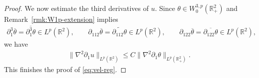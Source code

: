 \documentclass[10pt]{amsart}
\theoremstyle{definition}
\theoremstyle{remark}
\numberwithin{equation}{section}
\newcommand{\rd}{\partial}
\newcommand{\0}{\emptyset}
\newcommand{\tht}{\theta}
\newcommand{\bbR}{\mathbb R}
\begin{document}
\begin{proof}
		
		We now estimate the third derivatives of $u$. Since $\tht \in W^{3,p}_{0}(\bbR^2_{+})$ and Remark~\ref{rmk:W1p-extension} implies \begin{equation*}
			\begin{split}
				\rd_{1}^{3} \overline{\tht} = \overline{\rd_{1}^{3}\tht} \in L^p(\bbR^2), \qquad \rd_{112} \overline{\tht} = \widetilde{\rd_{112}\tht} \in L^p(\bbR^2), \qquad \rd_{122} \overline{\tht} = \overline{\rd_{122}\tht} \in L^p(\bbR^2),
			\end{split}
		\end{equation*} we have \begin{equation*}
			\begin{split}
				\| \nabla^2 \rd_{1} u \|_{L^p(\bbR^{2})} \leq C \| \nabla^2 \rd_{1} \tht \|_{L^p(\bbR^{2}_{+})}. 
			\end{split}
		\end{equation*} This finishes the proof of \eqref{eq:vel-reg}.
		

\end{proof}
\end{document}

